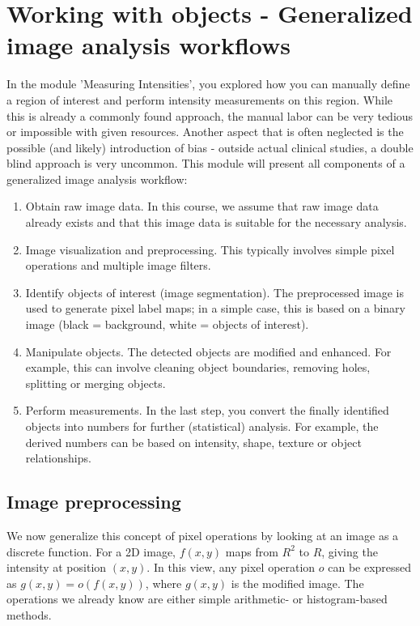 \chapter{Working with objects - Generalized image analysis workflows}

In the module 'Measuring Intensities', you explored how you can manually define a region of interest and perform intensity measurements on this region. While this is already a commonly found approach, the manual labor can be very tedious or impossible with given resources. Another aspect that is often neglected is the possible (and likely) introduction of bias - outside actual clinical studies, a double blind approach is very uncommon. This module will present all components of a generalized image analysis workflow:

\begin{enumerate}
	\item Obtain raw image data. In this course, we assume that raw image data already exists and that this image data is suitable for the necessary analysis.
	\item Image visualization and preprocessing. This typically involves simple pixel operations and multiple image filters.
	\item Identify objects of interest (image segmentation). The preprocessed image is used to generate pixel label maps; in a simple case, this is based on a binary image (black = background, white = objects of interest).
	\item Manipulate objects. The detected objects are modified and enhanced. For example, this can involve cleaning object boundaries, removing holes, splitting or merging objects.
	\item Perform measurements. In the last step, you convert the finally identified objects into numbers for further (statistical) analysis. For example, the derived numbers can be based on intensity, shape, texture or object relationships.
\end{enumerate}

\section{Image preprocessing}

We now generalize this concept of pixel operations by looking at an image as a discrete function. For a 2D image, $f(x,y)$ maps from $R^2$ to $R$, giving the intensity at position $(x,y)$. In this view, any pixel operation $o$ can be expressed as $g\left(x,y\right)=o\left(f\left(x,y\right)\right)$, where $g(x,y)$ is the modified image. The operations we already know are either simple arithmetic- or histogram-based methods. 

